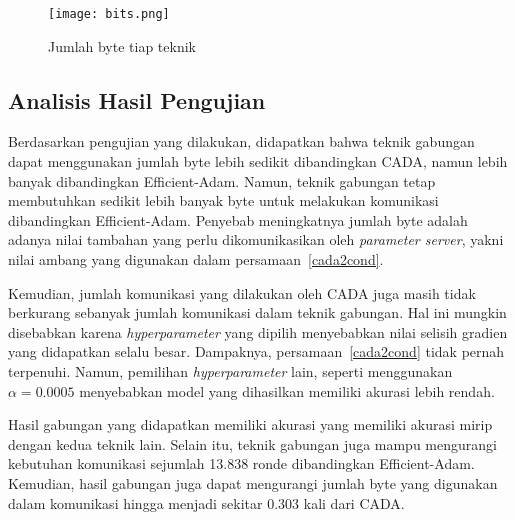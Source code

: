 \begin{figure}[ht]
  \centering
  \texttt{[image: bits.png]}
  \caption{Jumlah byte tiap teknik}\label{bits}
\end{figure}


\subsection{Analisis Hasil Pengujian}
Berdasarkan pengujian yang dilakukan, didapatkan bahwa teknik gabungan dapat menggunakan jumlah byte lebih sedikit dibandingkan CADA, namun lebih banyak dibandingkan Efficient-Adam. Namun, teknik gabungan tetap membutuhkan sedikit lebih banyak byte untuk melakukan komunikasi dibandingkan Efficient-Adam. Penyebab meningkatnya jumlah byte adalah adanya nilai tambahan yang perlu dikomunikasikan oleh \emph{parameter server}, yakni nilai ambang yang digunakan dalam persamaan~\ref{cada2cond}.

Kemudian, jumlah komunikasi yang dilakukan oleh CADA juga masih tidak berkurang sebanyak jumlah komunikasi dalam teknik gabungan. Hal ini mungkin disebabkan karena \emph{hyperparameter} yang dipilih menyebabkan nilai selisih gradien yang didapatkan selalu besar. Dampaknya, persamaan~\ref{cada2cond} tidak pernah terpenuhi. Namun, pemilihan \emph{hyperparameter} lain, seperti menggunakan $\alpha = 0.0005$ menyebabkan model yang dihasilkan memiliki akurasi lebih rendah.

Hasil gabungan yang didapatkan memiliki akurasi yang memiliki akurasi mirip dengan kedua teknik lain. Selain itu, teknik gabungan juga mampu mengurangi kebutuhan komunikasi sejumlah 13.838 ronde dibandingkan Efficient-Adam. Kemudian, hasil gabungan juga dapat mengurangi jumlah byte yang digunakan dalam komunikasi hingga menjadi sekitar 0.303 kali dari CADA.
